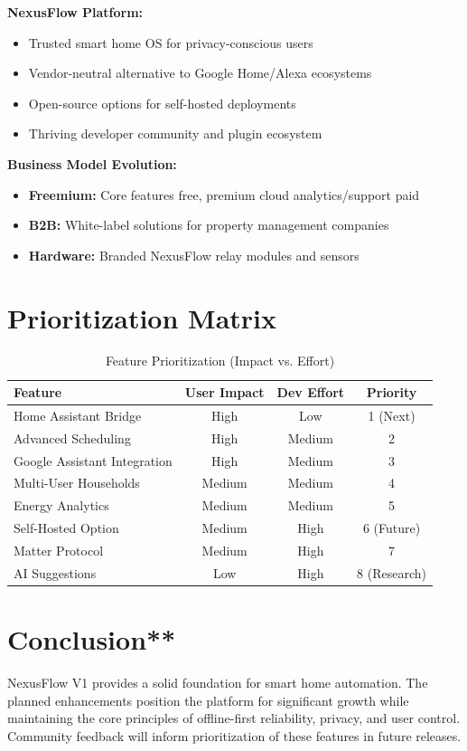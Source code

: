 \textbf{NexusFlow Platform:}
\begin{itemize}
    \item Trusted smart home OS for privacy-conscious users
    \item Vendor-neutral alternative to Google Home/Alexa ecosystems
    \item Open-source options for self-hosted deployments
    \item Thriving developer community and plugin ecosystem
\end{itemize}

\textbf{Business Model Evolution:}
\begin{itemize}
    \item \textbf{Freemium:} Core features free, premium cloud analytics/support paid
    \item \textbf{B2B:} White-label solutions for property management companies
    \item \textbf{Hardware:} Branded NexusFlow relay modules and sensors
\end{itemize}

\section{Prioritization Matrix}

\begin{table}[H]
\centering
\caption{Feature Prioritization (Impact vs. Effort)}
\label{tbl:prioritization}
\begin{tabular}{|l|c|c|c|}
\hline
\textbf{Feature} & \textbf{User Impact} & \textbf{Dev Effort} & \textbf{Priority} \\
\hline
Home Assistant Bridge & High & Low & 1 (Next) \\
\hline
Advanced Scheduling & High & Medium & 2 \\
\hline
Google Assistant Integration & High & Medium & 3 \\
\hline
Multi-User Households & Medium & Medium & 4 \\
\hline
Energy Analytics & Medium & Medium & 5 \\
\hline
Self-Hosted Option & Medium & High & 6 (Future) \\
\hline
Matter Protocol & Medium & High & 7 \\
\hline
AI Suggestions & Low & High & 8 (Research) \\
\hline
\end{tabular}
\end{table}

\section{Conclusion**}

NexusFlow V1 provides a solid foundation for smart home automation. The planned enhancements position the platform for significant growth while maintaining the core principles of offline-first reliability, privacy, and user control. Community feedback will inform prioritization of these features in future releases.
